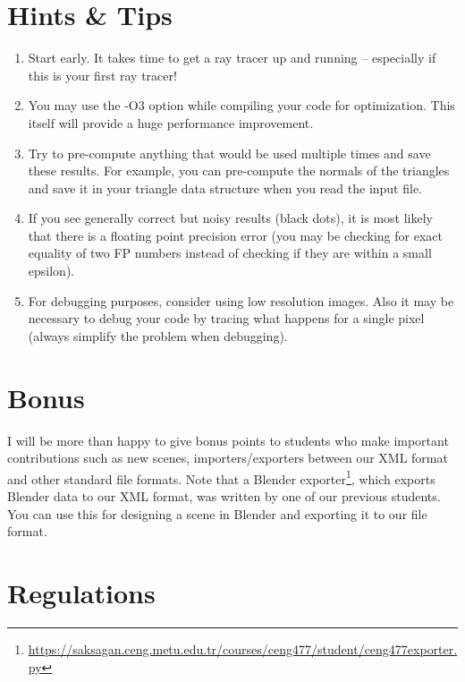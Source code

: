 \documentclass[12pt]{article}
\begin{document}
\section{Hints \& Tips}
\begin{enumerate}
\item \textbf{}Start early. It takes time to get a ray tracer up and
running -- especially if this is your first ray tracer!

\item \textbf{}You may  use  the -O3  option while  compiling  your  code for  optimization. This  itself will 
provide a huge performance improvement.

\item \textbf{}Try to pre-compute anything that would be used multiple times and save these results. For 
example, you can pre-compute the normals of the triangles and save it in your triangle data 
structure when you read the input file.

\item \textbf{}If you see generally correct but noisy results (black dots), it is most likely that there is a 
floating point precision error (you may be checking for exact equality of two FP numbers 
instead of checking if they are within a small epsilon).

\item \textbf{}For debugging purposes, consider using low resolution images. Also it may be necessary to 
debug your code by tracing what happens for a single pixel (always simplify the problem 
when debugging).

\end{enumerate}

\section{Bonus}

I will be more than happy to give bonus points to students who
make important contributions such as new scenes, importers/exporters
between our XML format and other standard file formats. Note that a
Blender
exporter\footnote{\url{https://saksagan.ceng.metu.edu.tr/courses/ceng477/student/ceng477exporter.py}},
which exports Blender data to our XML format, was written by one of our
previous students. You can use this for designing a scene in Blender and
exporting it to our file format.

\section{Regulations}
\end{document}
